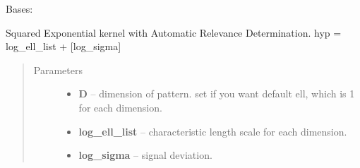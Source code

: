 \documentclass[letterpaper,10pt,english]{sphinxmanual}
\begin{document}
\begin{fulllineitems}
\label{pyGPs.Core:pyGPs.Core.cov.RBFard}
Bases: 

Squared Exponential kernel with Automatic Relevance Determination.
hyp = log\_ell\_list + {[}log\_sigma{]}
\begin{quote}\begin{description}
\item[{Parameters}] \leavevmode\begin{itemize}
\item {} 
\textbf{D} -- dimension of pattern. set if you want default ell, which is 1 for each dimension.

\item {} 
\textbf{log\_ell\_list} -- characteristic length scale for each dimension.

\item {} 
\textbf{log\_sigma} -- signal deviation.

\end{itemize}

\end{description}\end{quote}

\begin{fulllineitems}
\label{pyGPs.Core:pyGPs.Core.cov.RBFard.getCovMatrix}
\end{fulllineitems}


\begin{fulllineitems}
\label{pyGPs.Core:pyGPs.Core.cov.RBFard.getDerMatrix}
\end{fulllineitems}


\end{fulllineitems}

\end{document}
